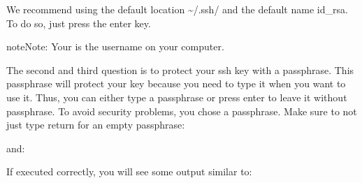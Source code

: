 We recommend using the default location \textasciitilde{}/.ssh/ and the default name id\_rsa.
To do so, just press the enter key.

\begin{sphinxadmonition}{note}{Note:}
Your  is the username on
your computer.
\end{sphinxadmonition}

The second and third question is to protect your ssh key with a
passphrase. This passphrase will protect your key because you need to
type it when you want to use it. Thus, you can either type a
passphrase or press enter to leave it without passphrase. To avoid
security problems, you  chose a passphrase. Make sure to not
just type return for an empty passphrase:

\begin{sphinxVerbatim}[commandchars=\\\{\}]
     
\end{sphinxVerbatim}

and:

\begin{sphinxVerbatim}[commandchars=\\\{\}]
   
\end{sphinxVerbatim}

If executed correctly, you will see some output similar to:

